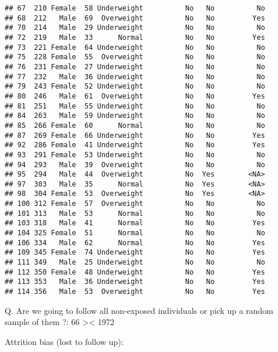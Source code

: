 \documentclass[
]{article}
\newenvironment{Shaded}{\begin{snugshade}}{\end{snugshade}}
\newcommand{\FunctionTok}[1]{\textcolor[rgb]{0.13,0.29,0.53}{\textbf{#1}}}
\newcommand{\NormalTok}[1]{#1}
\newcommand{\OtherTok}[1]{\textcolor[rgb]{0.56,0.35,0.01}{#1}}
\newcommand{\SpecialCharTok}[1]{\textcolor[rgb]{0.81,0.36,0.00}{\textbf{#1}}}
\begin{document}
\begin{verbatim}
## 67  210 Female  58 Underweight          No   No          No
## 68  212   Male  69  Overweight          No   No         Yes
## 70  214   Male  29 Underweight          No   No          No
## 72  219   Male  33      Normal          No   No         Yes
## 73  221 Female  64 Underweight          No   No          No
## 75  228 Female  55  Overweight          No   No          No
## 76  231 Female  27 Underweight          No   No          No
## 77  232   Male  36 Underweight          No   No          No
## 79  243 Female  52 Underweight          No   No          No
## 80  246   Male  61  Overweight          No   No         Yes
## 81  251   Male  55 Underweight          No   No          No
## 84  263   Male  59 Underweight          No   No          No
## 85  266 Female  60      Normal          No   No          No
## 87  269 Female  66 Underweight          No   No         Yes
## 92  286 Female  41 Underweight          No   No         Yes
## 93  291 Female  53 Underweight          No   No          No
## 94  293   Male  39  Overweight          No   No          No
## 95  294   Male  44  Overweight          No  Yes        <NA>
## 97  303   Male  35      Normal          No  Yes        <NA>
## 98  304 Female  53  Overweight          No  Yes        <NA>
## 100 312 Female  57  Overweight          No   No          No
## 101 313   Male  53      Normal          No   No          No
## 103 318   Male  41      Normal          No   No         Yes
## 104 325 Female  51      Normal          No   No          No
## 106 334   Male  62      Normal          No   No         Yes
## 109 345 Female  74 Underweight          No   No         Yes
## 111 349   Male  25 Underweight          No   No          No
## 112 350 Female  48 Underweight          No   No         Yes
## 113 353   Male  36 Underweight          No   No         Yes
## 114 356   Male  53  Overweight          No   No         Yes
\end{verbatim}

Q. Are we going to follow all non-exposed individuals or pick up a
random sample of them ?: 66 \textgreater\textless{} 1972

Attrition bias (lost to follow up):

\begin{Shaded}
\end{Shaded}
\end{document}
